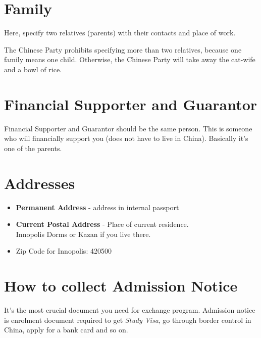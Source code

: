 \section{Family}\label{sec:ru_family}
Here, specify two relatives (parents)
with their contacts and place of work.


\begin{joke}
The Chinese Party prohibits specifying more than two relatives,
because one family means one child.
Otherwise, the Chinese Party will take away the
cat-wife and a bowl of rice.
\end{joke}





\section{Financial Supporter and Guarantor}\label{sec:ru_fin_supp}
Financial Supporter and Guarantor should be the same person.
This is someone who will financially support you (does not have to live in China).
Basically it's one of the parents.





\section{Addresses}\label{sec:ru_addr}

\begin{itemize}
    \item \textbf{Permanent Address} - address in internal passport
    \item \textbf{Current Postal Address} - Place of current residence.\\
        Innopolis Dorms or Kazan if you live there.
    \item Zip Code for Innopolis: 420500
\end{itemize}







\section{How to collect Admission Notice}\label{sec:ru_adm_not_delivery}

It's the most crucial document you need for exchange program.
Admission notice is enrolment document required to get \textit{Study Visa},
go through border control in China, apply for a bank card and so on.

